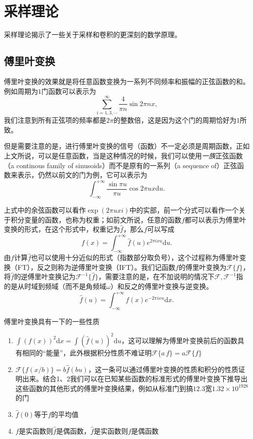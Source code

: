 \documentclass{ctexart}
\begin{document}
	\section{采样理论}
	采样理论揭示了一些关于采样和卷积的更深刻的数学原理。

	\subsection{傅里叶变换}
	傅里叶变换的效果就是将任意函数变换为一系列不同频率和振幅的正弦函数的和。例如周期为$1$门函数可以表示为
	\[\sum_{i=1,3,\cdots}^\infty{\frac4{\pi n}\sin{2\pi nx}},\]
	我们注意到所有正弦项的频率都是$2\pi$的整数倍，这是因为这个门的周期恰好为$1$所致。

	但是需要注意的是，进行傅里叶变换的信号（函数）不一定必须是周期函数，正如上文所说，可以是任意函数，当是这种情况的时候，我们可以使用\emph{一族}正弦函数（a continous family of sinusoids）而不是原有的一系列（a sequence of）正弦函数来表示，仍然以前文的门为例，它可以表示为
	\[\int_{-\infty}^{+\infty}{\frac{\sin{\pi u}}{\pi u}{\cos{2\pi ux}}\mathrm du}.\]

	上式中的余弦函数可以看作$\exp(2\pi uxi)$中的实部，前一个分式可以看作一个关于积分变量的函数，也称为权重；如前文所说，任意的函数$f$都可以表示为傅里叶变换的形式，在这个形式中，权重记为$\hat f$，那么$f$可以写成
	\[f(x)=\int_{-\infty}^{+\infty} \hat f(u) e^{2\pi ixu} \mathrm du.\tag{IFT}\]
	由$f$计算$\hat f$也可以使用十分近似的形式（指数部分取负号），这个过程称为傅里叶变换（FT），反之则称为逆傅里叶变换（IFT）。我们记函数$f$的傅里叶变换为$\mathcal{F} \{f\}$，将$\hat f$的逆傅里叶变换记为$\mathcal F^{-1}\{\hat f\}$，需要注意的是，在不加说明的情况下$\mathcal F,\mathcal F^{-1}$指的是从时域到频域（而不是角频域$\omega$）和反之的傅里叶变换与逆变换。
	\[\hat f(u)=\int_{-\infty}^{+\infty} f(x) e^{-2\pi ixu} \mathrm dx.\tag{FT}\]

	傅里叶变换具有一下的一些性质
	\begin{enumerate}
		\item $\int (f(x))^2\mathrm dx=\int (\hat f(u))^2\mathrm du$，这可以理解为傅里叶变换前后的函数具有相同的“能量”，此外根据积分性质不难证明$\mathcal F\{a\,f\}=a\mathcal F\{f\}$
		\item $\mathcal F\{f(x/b)\}=b\hat f(bu)$，这一条可以通过傅里叶变换的性质和积分的性质证明出来。结合1、2我们可以在已知某些函数的标准形式的傅里叶变换下推导出这些函数的其他形式的傅里叶变换结果，例如从标准门到搞$12.3$宽$1.32\times10^{1928}$的门
		\item $\hat f(0)$等于$f$的平均值
		\item $f$是实函数则$\hat f$是偶函数，$\hat f$是实函数则$f$是偶函数
	\end{enumerate}
\end{document}
